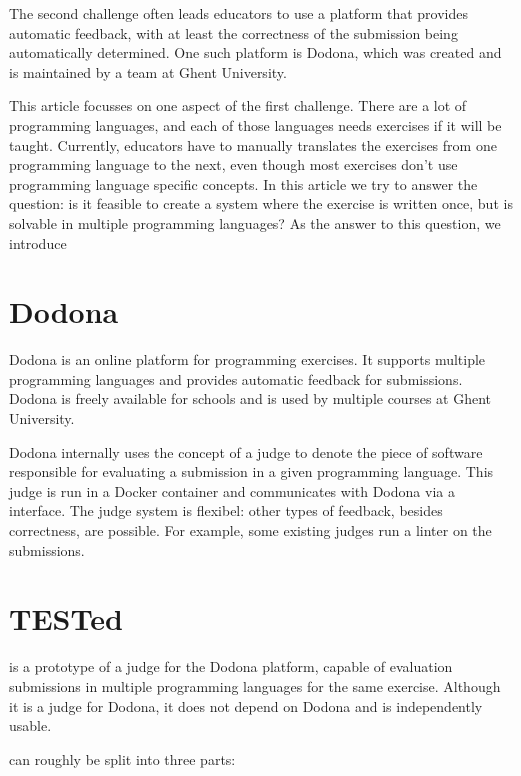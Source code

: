 \begin{multicols}{2}
    The second challenge often leads educators to use a platform that provides automatic feedback, with at least the correctness of the submission being automatically determined.
    One such platform is Dodona, which was created and is maintained by a team at Ghent University.
    
    This article focusses on one aspect of the first challenge.
    There are a lot of programming languages, and each of those languages needs exercises if it will be taught.
    Currently, educators have to manually translates the exercises from one programming language to the next, even though most exercises don't use programming language specific concepts.
    In this article we try to answer the question: is it feasible to create a system where the exercise is written once, but is solvable in multiple programming languages?
    As the answer to this question, we introduce \tested{}

    \section{Dodona}\label{sec:extended-dodona}

    Dodona is an online platform for programming exercises.
    It supports multiple programming languages and provides automatic feedback for submissions.
    Dodona is freely available for schools and is used by multiple courses at Ghent University.
    
    Dodona internally uses the concept of a judge to denote the piece of software responsible for evaluating a submission in a given programming language.
    This judge is run in a Docker container and communicates with Dodona via a  interface.
    The judge system is flexibel: other types of feedback, besides correctness, are possible.
    For example, some existing judges run a linter on the submissions.

    \section{TESTed}\label{sec:extended-test}
    
    \tested{} is a prototype of a judge for the Dodona platform, capable of evaluation submissions in multiple programming languages for the same exercise.
    Although it is a judge for Dodona, it does not depend on Dodona and is independently usable.
    
    \tested{} can roughly be split into three parts:
    

\end{multicols}

